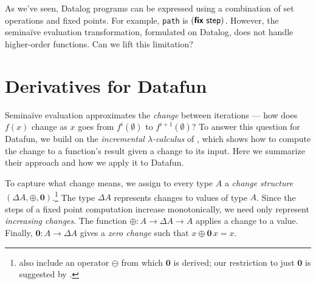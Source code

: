 \documentclass[sigplan,screen,dvipsnames]{acmart}
\newcommand{\naive}{na\"ive}
\newcommand{\Naive}{Na\"ive}
\newcommand{\D}{\Delta}
\renewcommand{\d}{\delta}
\newcommand{\zero}{\mathbf{0}}
\newcommand{\kw}[1]{\textsf{\bfseries #1}}
\newcommand{\tlv}[1]{\textsf{#1}}
\newcommand{\var}[1]{\mathit{#1}}
\newcommand{\dee}[1]{\var{d#1}}
\newcommand{\efix}{\kw{fix}~}
\begin{document}
As we've seen, Datalog programs can be expressed using a combination of set
operations and fixed points. For example, \texttt{path} is
$(\efix{\tlv{step}})$. However, the semi\naive{} evaluation transformation,
formulated on Datalog, does not handle higher-order functions. Can we lift this limitation?

\section{Derivatives for Datafun}




%
Semi\naive{} evaluation approximates the \emph{change} between iterations ---
how does $f(x)$ change as $x$ goes from $f^{i}(\emptyset)$ to
$f^{i+1}(\emptyset)$?
%
To answer this question for Datafun, we build on the \emph{incremental
  $\lambda$-calculus} of \citet{incremental}, which shows how to compute the
change to a function's result given a change to its input.
%
Here we summarize their approach and how we apply it to Datafun.


To capture what change means, we assign to every type $A$ a \emph{change
  structure} $(\D A, \oplus, \zero)$.\footnote{ also
  include an operator $\ominus$ from which $\zero$ is derived; our restriction
  to just $\zero$ is suggested by \citet{atkey-changes}.}
%
The type $\D A$ represents changes to values of type $A$. Since the steps of a fixed point computation increase monotonically, we need only represent \emph{increasing changes}.
%
The function $\oplus : A \to \Delta A \to A$ applies a change to a value.
Finally, $\zero : A \to \Delta A$ gives a \emph{zero change} such that $x \oplus
\zero\,x = x$.
\end{document}
